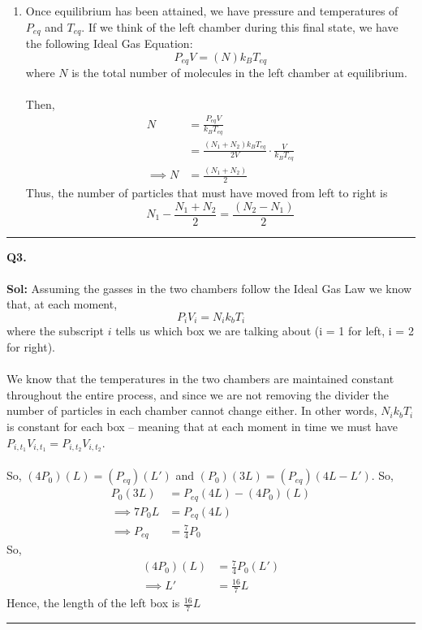 \documentclass[twoside]{article}
\begin{document}
\begin{enumerate}[label=(\alph*)]
   \item Once equilibrium has been attained, we have pressure and temperatures of $P_{eq}$ and $T_{eq}$. If we think of the left chamber during this final state, we have the following Ideal Gas Equation:
   \[ P_{eq} V = (N) k_B T_{eq} \]
   where $N$ is the total number of molecules in the left chamber at equilibrium.
   \\
   \\
   Then, 
   \begin{align*}
      N &= \frac{P_{eq}V}{k_B T_{eq}} \\
        &= \frac{(N_1 + N_2)k_B T_{eq}}{2V} \cdot \frac{V}{k_B T_{eq}} \\
      \implies N &= \frac{(N_1 + N_2)}{2}
   \end{align*}
   Thus, the number of particles that must have moved from left to right is
   \[ N_1 - \frac{N_1 + N_2}{2} = \frac{(N_2 - N_1)}{2} \]
\end{enumerate}
\vskip 0.25cm
\hrule
\vskip 1cm

\textbf{Q3.} 
\\
\\
\textbf{Sol:} Assuming the gasses in the two chambers follow the Ideal Gas Law we know that, at each moment,
\[ P_i V_i = N_i k_b T_i \] where the subscript $i$ tells us which box we are talking about (i = 1 for left, i = 2 for right).
\\
\\
We know that the temperatures in the two chambers are maintained constant throughout the entire process, and since we are not removing the divider the number of particles in each chamber cannot change either. In other words, $N_i k_b T_i$ is constant for each box -- meaning that at each moment in time we must have $P_{i, t_1} V_{i, t_1} = P_{i, t_2} V_{i, t_2}$.
\\
\\
So, $(4P_0)(L) = (P_{eq})(L')$ and $(P_0)(3L) = (P_{eq})(4L - L')$. So,
\begin{align*}
   P_0 (3L) &= P_{eq}(4L) - (4P_0)(L) \\
   \implies 7P_0 L &= P_{eq} (4L)\\
   \implies P_{eq} &= \frac{7}{4}P_0 
\end{align*}
So,
\begin{align*}
   (4P_0)(L) &= \frac{7}{4}P_0(L') \\
   \implies L' &= \frac{16}{7}L
\end{align*}
Hence, the length of the left box is $\boxed{\frac{16}{7}L}$
\vskip 0.25cm
\hrule
\vskip 1cm
\end{document}
